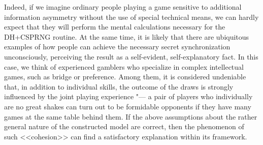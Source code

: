 Indeed, if we imagine ordinary people playing a game sensitive to additional information asymmetry without the use of special technical means, we can hardly expect that they will perform the mental calculations necessary for the DH+CSPRNG routine. At the same time, it is likely that there are ubiquitous examples of how people can achieve the necessary secret synchronization unconsciously, perceiving the result as a self-evident, self-explanatory fact. In this case, we think of experienced gamblers who specialize in complex intellectual games, such as bridge or preference. Among them, it is considered undeniable that, in addition to individual skills, the outcome of the draws is strongly influenced by the joint playing experience "--- a pair of players who individually are no great shakes can turn out to be formidable opponents if they have many games at the same table behind them. If the above assumptions about the rather general nature of the constructed model are correct, then the phenomenon of such <<cohesion>> can find a satisfactory explanation within its framework. %

